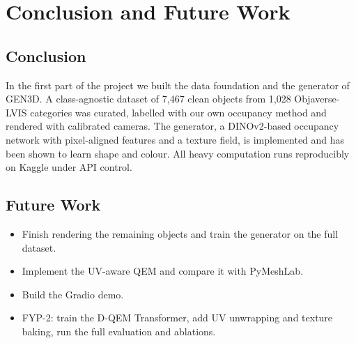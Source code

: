 \chapter{Conclusion and Future Work}

\section{Conclusion}
In the first part of the project we built the data foundation and the generator of GEN3D. A class-agnostic dataset of 7{,}467 clean objects from 1{,}028 Objaverse-LVIS categories was curated, labelled with our own occupancy method and rendered with calibrated cameras. The generator, a DINOv2-based occupancy network with pixel-aligned features and a texture field, is implemented and has been shown to learn shape and colour. All heavy computation runs reproducibly on Kaggle under API control.

\section{Future Work}
\begin{itemize}[leftmargin=*]
  \item Finish rendering the remaining objects and train the generator on the full dataset.
  \item Implement the UV-aware QEM and compare it with PyMeshLab.
  \item Build the Gradio demo.
  \item FYP-2: train the D-QEM Transformer, add UV unwrapping and texture baking, run the full evaluation and ablations.
\end{itemize}
